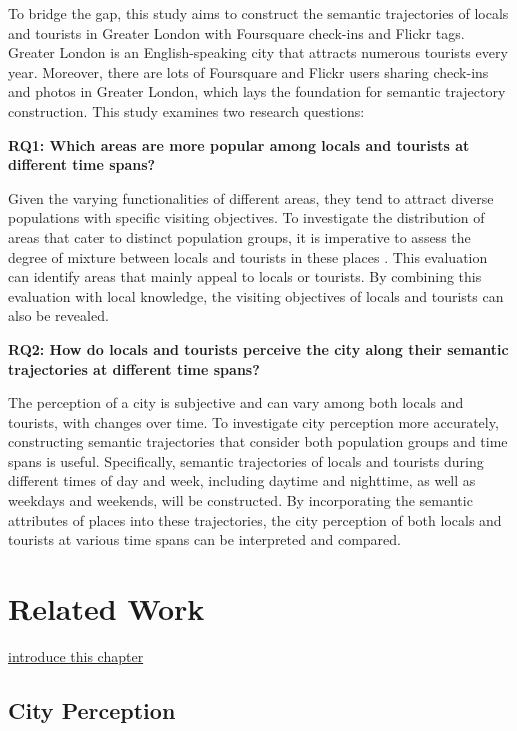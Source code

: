 \documentclass{article}
\theoremstyle{definition}
\theoremstyle{remark}
\begin{document}
To bridge the gap, this study aims to construct the semantic trajectories of locals and tourists in Greater London with Foursquare check-ins and Flickr tags. Greater London is an English-speaking city that attracts numerous tourists every year. Moreover, there are lots of Foursquare and Flickr users sharing check-ins and photos in Greater London, which lays the foundation for semantic trajectory construction. This study examines two research questions:

\textbf{RQ1: Which areas are more popular among locals and tourists at different time spans?}

Given the varying functionalities of different areas, they tend to attract diverse populations with specific visiting objectives. To investigate the distribution of areas that cater to distinct population groups, it is imperative to assess the degree of mixture between locals and tourists in these places \citep{li_analyzing_2018}. This evaluation can identify areas that mainly appeal to locals or tourists. By combining this evaluation with local knowledge, the visiting objectives of locals and tourists can also be revealed.

\textbf{RQ2: How do locals and tourists perceive the city along their semantic trajectories at different time spans?}

The perception of a city is subjective and can vary among both locals and tourists, with changes over time. To investigate city perception more accurately, constructing semantic trajectories that consider both population groups and time spans is useful. Specifically, semantic trajectories of locals and tourists during different times of day and week, including daytime and nighttime, as well as weekdays and weekends, will be constructed. By incorporating the semantic attributes of places into these trajectories, the city perception of both locals and tourists at various time spans can be interpreted and compared.

\clearpage

\section{Related Work}
\underline{introduce this chapter}

\subsection{City Perception}
\end{document}
